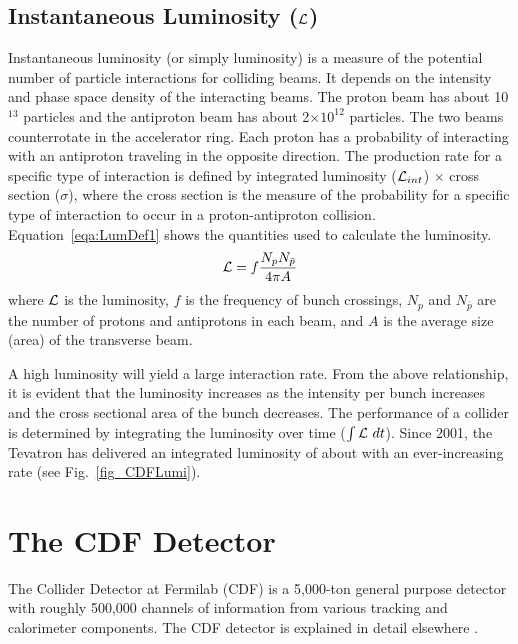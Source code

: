\subsection{Instantaneous Luminosity ($\cal L$)}
Instantaneous luminosity (or simply luminosity) is a measure of the potential number of particle interactions for colliding beams. It depends on the intensity and phase space density of the interacting beams. The proton beam has about 10$^{13}$ particles and the antiproton beam has about 2$\times10^{12}$ particles. The two beams counterrotate in the accelerator ring.
Each proton has a probability of interacting with an antiproton traveling in the opposite direction. The production rate for a specific type of interaction is defined by integrated luminosity (${\cal L}_{int}$) $\times$ cross section ($\sigma$), where the cross section is the measure of the probability for a specific type of interaction to occur in a proton-antiproton collision. Equation~\ref{eqa:LumDef1} shows the quantities used to calculate the luminosity.
\begin{equation}
{\cal L} = f \frac{N_{p}N_{\bar p}}{4\pi A}
\label{eqa:LumDef1}
\end{equation}
where $\cal L$ is the luminosity, $f$ is the frequency of bunch crossings, $N_{p}$ and $N_{\bar p}$ are the number of protons and antiprotons in each beam, and $A$ is the average size (area) of the transverse beam.

A high luminosity will yield a large interaction rate. From the above relationship, it is evident that the luminosity increases as the intensity per bunch increases and the cross sectional area of the bunch decreases. The performance of a collider is determined by integrating the luminosity over time ($\int{\cal L}~dt$). Since 2001, the Tevatron has delivered an integrated luminosity of about \cdfTotCurrLum with an ever-increasing rate (see Fig.~\ref{fig_CDFLumi}).

\section{The CDF Detector}
The Collider Detector at Fermilab (CDF) is a 5,000-ton general purpose detector with roughly 500,000 channels of information from various tracking and calorimeter components. The CDF detector is explained in detail elsewhere \cite{pap:CDFTDR, pap:CDFdetectorOverview}.

